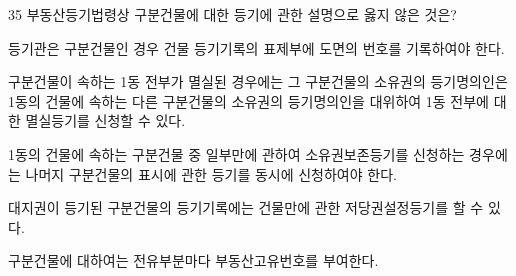\begin{question}{35}
부동산등기법령상 구분건물에 대한 등기에 관한 설명으로 옳지 않은 것은?
\begin{choices}
  \item 등기관은 구분건물인 경우 건물 등기기록의 표제부에 도면의 번호를 기록하여야 한다.
  \item 구분건물이 속하는 1동 전부가 멸실된 경우에는 그 구분건물의 소유권의 등기명의인은 1동의 건물에 속하는 다른 구분건물의 소유권의 등기명의인을 대위하여 1동 전부에 대한 멸실등기를 신청할 수 있다.
  \item 1동의 건물에 속하는 구분건물 중 일부만에 관하여 소유권보존등기를 신청하는 경우에는 나머지 구분건물의 표시에 관한 등기를 동시에 신청하여야 한다.
  \item 대지권이 등기된 구분건물의 등기기록에는 건물만에 관한 저당권설정등기를 할 수 있다.
  \item 구분건물에 대하여는 전유부분마다 부동산고유번호를 부여한다.
\end{choices}
\end{question}
